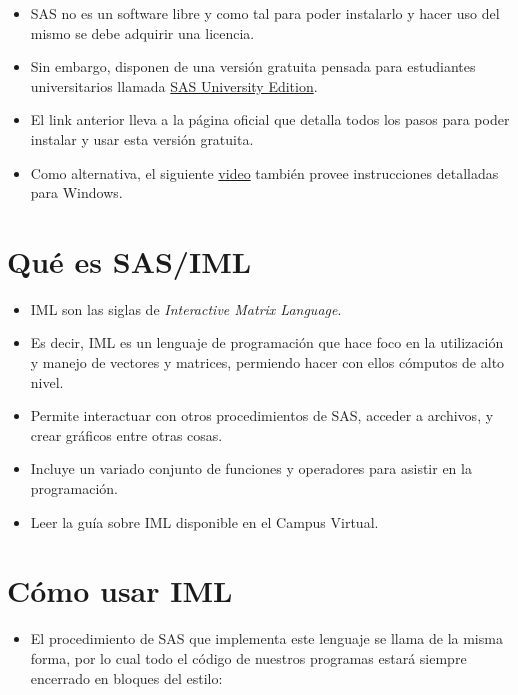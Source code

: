 \documentclass[]{book}
\providecommand{\tightlist}{%
  \setlength{\itemsep}{0pt}\setlength{\parskip}{0pt}}
\begin{document}
\begin{itemize}
\tightlist
\item
  SAS no es un software libre y como tal para poder instalarlo y hacer
  uso del mismo se debe adquirir una licencia.
\item
  Sin embargo, disponen de una versión gratuita pensada para estudiantes
  universitarios llamada
  \href{https://www.sas.com/en_us/software/university-edition.html}{SAS
  University Edition}.
\item
  El link anterior lleva a la página oficial que detalla todos los pasos
  para poder instalar y usar esta versión gratuita.
\item
  Como alternativa, el siguiente
  \href{https://www.youtube.com/watch?v=932o9X-8QzM}{video} también
  provee instrucciones detalladas para Windows.
\end{itemize}

\section{Qué es SAS/IML}\label{que-es-sasiml}

\begin{itemize}
\tightlist
\item
  IML son las siglas de \emph{Interactive Matrix Language}.
\item
  Es decir, IML es un lenguaje de programación que hace foco en la
  utilización y manejo de vectores y matrices, permiendo hacer con ellos
  cómputos de alto nivel.
\item
  Permite interactuar con otros procedimientos de SAS, acceder a
  archivos, y crear gráficos entre otras cosas.
\item
  Incluye un variado conjunto de funciones y operadores para asistir en
  la programación.
\item
  Leer la guía sobre IML disponible en el Campus Virtual.
\end{itemize}

\section{Cómo usar IML}\label{como-usar-iml}

\begin{itemize}
\tightlist
\item
  El procedimiento de SAS que implementa este lenguaje se llama de la
  misma forma, por lo cual todo el código de nuestros programas estará
  siempre encerrado en bloques del estilo:
\end{itemize}
\end{document}
